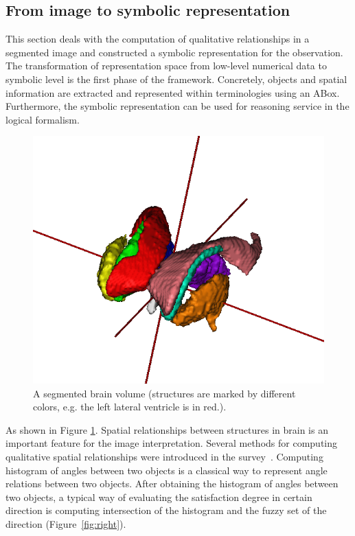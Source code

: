 \documentclass{article}
\begin{document}
\subsection{From image to symbolic representation}
 This section deals with the computation of qualitative relationships in a segmented image and constructed a symbolic representation for the observation. 
The transformation of representation space from low-level numerical data to symbolic level is the first phase of the framework.
Concretely, objects and spatial information are extracted and represented within terminologies using an ABox.
Furthermore, the symbolic representation can be used for  reasoning service in the logical formalism.

\begin{figure}[h]
 \centering
 \includegraphics[width=.3\textwidth]{./figures/mesh_all_vue_45.png}
 \caption{\label{fig:brain3d}A segmented brain volume (structures are marked by different colors, e.g. the left lateral ventricle is in red.).}
\end{figure}
As  shown in Figure \ref{fig:brain3d}.
Spatial relationships between structures in brain is an important feature for the image interpretation. 
Several methods for computing qualitative spatial relationships were introduced in the survey~\cite{Bloch2005fuzzy}.
Computing histogram of angles between two objects is a classical way to represent angle relations between two objects.
After obtaining the histogram of angles between two objects, a typical way of evaluating the satisfaction degree in certain
direction is computing intersection of the histogram and the fuzzy set of the direction (Figure~\ref{fig:right}).
\end{document}
